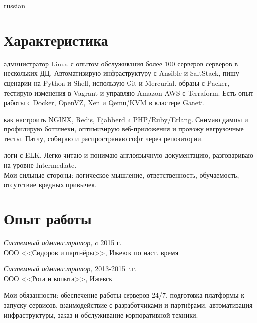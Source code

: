 \documentclass[margin, 10pt]{res}
\begin{document}
\begin{otherlanguage*}{russian}
\begin{resume}
\section{Характеристика}

\setlength\parindent{12pt}

 администратор Linux с опытом обслуживания более 100 серверов серверов
в нескольких ДЦ. Автоматизирую инфраструктуру с Ansible и SaltStack, пишу
сценарии на Python и Shell, использую Git и Mercurial.
\setlength{\parskip}{0.5em}
 образы с Packer, тестирую изменения в Vagrant и управляю Amazon AWS
с Terraform. Есть опыт работы с Docker, OpenVZ, Xen и Qemu/KVM в кластере
Ganeti.

 как настроить NGINX, Redis, Ejabberd и PHP/Ruby/Erlang.
Снимаю дампы и профилирую боттлнеки, оптимизирую веб-приложения и провожу
нагрузочные тесты. Патчу, собираю и распространяю софт через репозитории.

 логи с ELK. Легко читаю и понимаю англоязычную документацию,
разговариваю на уровне Intermediate.\\

Мои сильные стороны: логическое мышление, ответственность, обучаемость,
отсутствие вредных привычек.

\setlength\parindent{0pt}


\section{Опыт работы}

{\sl Системный администратор,} \hfill c 2015 г.\\
ООО <<Сидоров и партнёры>>, Ижевск \hfill по наст. время
\setlength{\parskip}{1em}

{\sl Системный администратор,} \hfill 2013-2015 г.г. \\
ООО <<Рога и копыта>>, Ижевск

Мои обязанности: обеспечение работы серверов 24/7, подготовка платформы к
запуску сервисов, взаимодействие с разработчиками и партнёрами, автоматизация
инфраструктуры, заказ и обслуживание корпоративной техники.



\end{resume}
\end{otherlanguage*}
\end{document}
